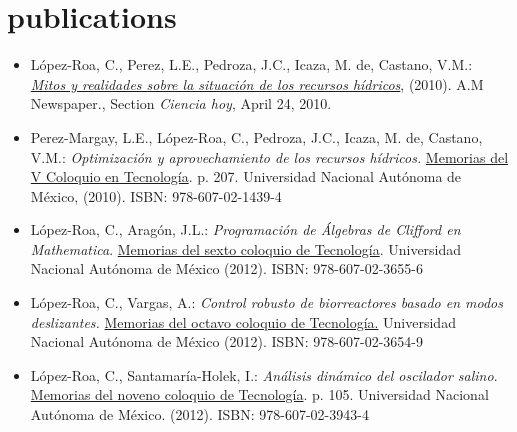 \documentclass[]{friggeri-cv}
\begin{document}
\section{publications}
\begin{itemize}

\item L\'{o}pez-Roa, C., Perez, L.E., Pedroza, J.C., Icaza, M. de, Castano, V.M.: \href{http://dl.dropbox.com/u/2115508/SRH.pdf}{\emph{Mitos y realidades sobre la situaci\'{o}n de los recursos h\'{i}dricos}}, (2010). A.M Newspaper., Section \emph{Ciencia hoy}, April 24, 2010.

\item Perez-Margay, L.E., L\'{o}pez-Roa, C., Pedroza, J.C., Icaza, M. de, Castano, V.M.: \emph{Optimizaci\'{o}n y aprovechamiento de los recursos h\'{i}dricos.} \href{http://tecnologia.fata.unam.mx/sites/tecnologia.fata.unam.mx/files/coloquio/MC05.pdf}{Memorias del V Coloquio en Tecnolog\'{i}a}. p. 207. Universidad Nacional Aut\'{o}noma de M\'{e}xico, (2010). ISBN: 978-607-02-1439-4

\item L\'{o}pez-Roa, C., Arag\'{o}n, J.L.: \emph{Programaci\'{o}n de \'{A}lgebras de Clifford en Mathematica}. \href{http://dl.dropboxusercontent.com/u/2115508/COT5.pdf}{Memorias del sexto coloquio de Tecnolog\'{i}a}. Universidad Nacional Aut\'{o}noma de M\'{e}xico (2012). ISBN: 978-607-02-3655-6

\item L\'{o}pez-Roa, C., Vargas, A.: \emph{Control robusto de biorreactores basado en modos deslizantes.} \href{https://dl.dropboxusercontent.com/u/2115508/REX6CLR.pdf}{Memorias del octavo coloquio de Tecnolog\'{i}a.} Universidad Nacional Aut\'{o}noma de M\'{e}xico (2012). ISBN: 978-607-02-3654-9

\item L\'{o}pez-Roa, C., Santamar\'{i}a-Holek, I.: \emph{An\'{a}lisis din\'{a}mico del oscilador salino}. \href{https://dl.dropboxusercontent.com/u/2115508/REX7.pdf}{Memorias del noveno coloquio de Tecnolog\'{i}a}. p. 105. Universidad Nacional Aut\'{o}noma de M\'{e}xico. (2012). ISBN: 978-607-02-3943-4

%
\end{itemize} 
\end{document}
